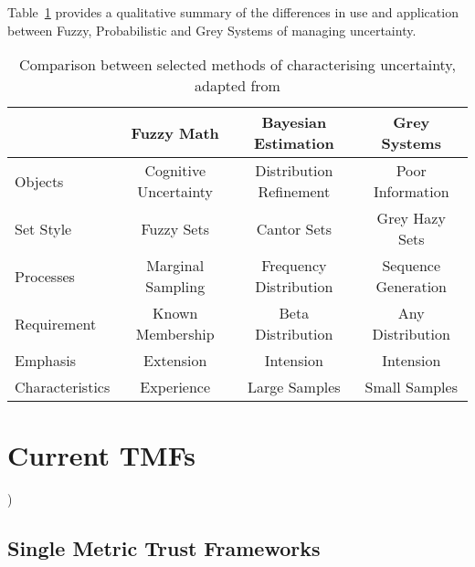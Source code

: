 

Table~\ref{tab:uncertainty} provides a qualitative summary of the differences in use and application between Fuzzy, Probabilistic and Grey Systems of managing uncertainty.


\begin{table}[h]
  \caption{Comparison between selected methods of characterising uncertainty, adapted from \cite{Guo11} \cite{Liu2006} \cite{Ng1994} \cite{Wang2006} }
  \label{tab:uncertainty}
  \begin{center}
    \setlength{\tabcolsep}{8pt}
    \begin{tabular}{l|ccc}
      \toprule
        & Fuzzy Math & Bayesian Estimation & Grey Systems \\
      \midrule
      Objects & Cognitive Uncertainty & Distribution Refinement & Poor Information \\
      Set Style & Fuzzy Sets & Cantor Sets & Grey Hazy Sets \\
      Processes & Marginal Sampling & Frequency Distribution & Sequence Generation \\
      Requirement & Known Membership & Beta Distribution & Any Distribution \\
      Emphasis & Extension & Intension & Intension \\
      Characteristics & Experience & Large Samples & Small Samples\\
     \bottomrule
    \end{tabular}
    \setlength{\tabcolsep}{6pt}
  \end{center}
\end{table}


\section{Current TMFs})
\subsection{Single Metric Trust Frameworks}

